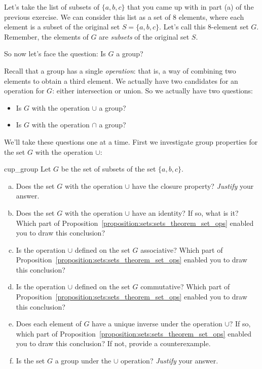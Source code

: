 Let's take the list of subsets of $\{a,b,c\}$ that you came up with in part (a) of the previous exercise. We can consider this list as a set of 8 elements, where each element is a subset of the original set $S = \{a,b,c\}$. Let's call this 8-element set $G$. Remember, the elements of $G$ are \emph{subsets} of the original set $S$.

So now let's face the question:  Is $G$ a group? 

Recall that a group has a single \emph{operation}: that is, a way of combining two elements to obtain a third element. We actually have two candidates for an operation for $G$: either intersection or union. So we actually have two questions:
\begin{itemize}
\item
 Is $G$ with the operation $\cup$ a group?
\item
Is $G$ with the operation $\cap$ a group?
\end{itemize}

We'll take these questions one at a time. First we investigate group properties for the set $G$ with the operation $\cup$:

\begin{exercise}{cup_group}
Let $G$ be the set of subsets of the set $\{a,b,c\}$.
\begin{enumerate}[(a)]
\item
Does the set $G$  with the operation $\cup$ have the closure property? \emph{Justify} your answer.
\item
Does the set $G$  with the operation $\cup$ have an identity? If so, what is it? Which part of  Proposition~\ref{proposition:sets:sets_theorem_set_ops} enabled you to draw this conclusion?
\item
Is the operation $\cup$ defined on the set $G$ associative? Which part of  Proposition~\ref{proposition:sets:sets_theorem_set_ops} enabled you to draw this conclusion?
\item
Is the operation $\cup$ defined on the set $G$ commutative? Which part of  Proposition~\ref{proposition:sets:sets_theorem_set_ops} enabled you to draw this conclusion?
\item
Does each element of $G$ have a unique inverse under the operation $\cup$? If so, which part of  Proposition~\ref{proposition:sets:sets_theorem_set_ops} enabled you to draw this conclusion? If not, provide a counterexample.
\item
Is the set $G$ a group under the $\cup$ operation?  \emph{Justify} your answer.
\end{enumerate}
\end{exercise} 

